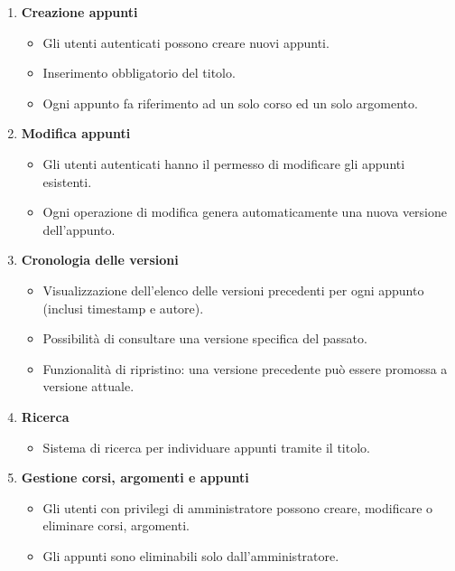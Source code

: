\begin{enumerate}[label=\textbf{RF\arabic*}, widest=RF10, leftmargin=*, align=left]
    \item \textbf{Creazione appunti}
        \begin{itemize}[nosep, leftmargin=0cm]
            \item Gli utenti autenticati possono creare nuovi appunti.
            \item Inserimento obbligatorio del titolo.
            \item Ogni appunto fa riferimento ad un solo corso ed un solo argomento.
        \end{itemize}

    \item \textbf{Modifica appunti}
        \begin{itemize}[nosep, leftmargin=0cm]
            \item Gli utenti autenticati hanno il permesso di modificare gli appunti esistenti.
            \item Ogni operazione di modifica genera automaticamente una nuova versione dell'appunto.
        \end{itemize}

    \item \textbf{Cronologia delle versioni}
        \begin{itemize}[nosep, leftmargin=0cm]
            \item Visualizzazione dell'elenco delle versioni precedenti per ogni appunto (inclusi timestamp e autore).
            \item Possibilità di consultare una versione specifica del passato.
            \item Funzionalità di ripristino: una versione precedente può essere promossa a versione attuale.
        \end{itemize}

    \item \textbf{Ricerca}
        \begin{itemize}[nosep, leftmargin=0cm]
            \item Sistema di ricerca per individuare appunti tramite il titolo.
        \end{itemize}

    \item \textbf{Gestione corsi, argomenti e appunti}
        \begin{itemize}[nosep, leftmargin=0cm]
            \item Gli utenti con privilegi di amministratore possono creare, modificare o eliminare corsi, argomenti. 
            \item Gli appunti sono eliminabili solo dall'amministratore.
        \end{itemize}
\end{enumerate}

